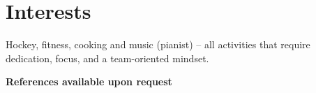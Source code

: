 	\section{Interests}
	
	\begin{onecolentry}
		Hockey, fitness, cooking and music (pianist) – all activities that require dedication, focus, and a team-oriented mindset.
	\end{onecolentry}
	
	\vspace{0.2 cm}
	
	\begin{onecolentry}
		\begin{center}
			\textbf{References available upon request}
		\end{center}
	\end{onecolentry}

